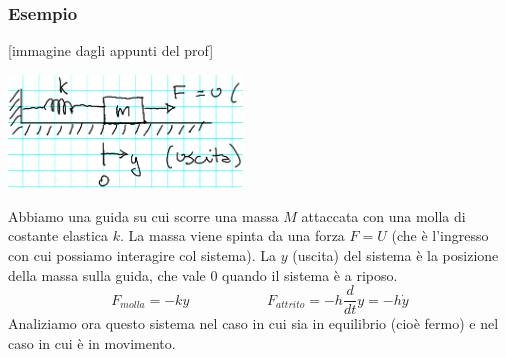 \subsubsection{Esempio}
[immagine dagli appunti del prof]
\begin{center}
    \includegraphics[height=3cm]{../lezione1/img6.PNG}
\end{center}
Abbiamo una guida su cui scorre una massa $M$ attaccata con una molla di costante elastica $k$. La massa viene spinta da una forza $F = U$ (che è l'ingresso con cui possiamo interagire col sistema). La $y$ (uscita) del sistema è la posizione della massa sulla guida, che vale $0$ quando il sistema è a riposo.
\[
    F_{molla} = -ky \;\;\;\;\;\;\;\;\;\;\;\;\;\;\;\;\;\;\;\;F_{attrito} = - h \frac{d}{dt}y = -h \dot{y}
\]
Analiziamo ora questo sistema nel caso in cui sia in equilibrio (cioè fermo) e nel caso in cui è in movimento.

